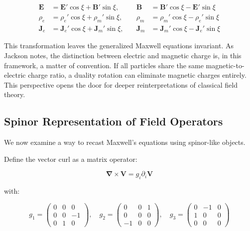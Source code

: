 \documentclass {article}
\renewcommand\vec{\mathbf}
\let\OldS\nabla
\renewcommand{\nabla}{\boldsymbol{\OldS}}
\begin{document}
\begin{equation}
\begin{aligned}
\vec{E} &= \vec{E}' \cos \xi + \vec{B}' \sin \xi, \quad
&\vec{B} &= \vec{B}' \cos \xi - \vec{E}' \sin \xi \\
\rho_e &= \rho_e' \cos \xi + \rho_m' \sin \xi, \quad
&\rho_m &= \rho_m' \cos \xi - \rho_e' \sin \xi \\
\vec{J}_e &= \vec{J}_e' \cos \xi + \vec{J}_m' \sin \xi, \quad
&\vec{J}_m &= \vec{J}_m' \cos \xi - \vec{J}_e' \sin \xi
\end{aligned}
\end{equation}


This transformation leaves the generalized Maxwell equations invariant. As Jackson notes, the distinction between electric and magnetic charge is, in this framework, a matter of convention. If all particles share the same magnetic-to-electric charge ratio, a duality rotation can eliminate magnetic charges entirely. This perspective opens the door for deeper reinterpretations of classical field theory.

\subsection{Spinor Representation of Field Operators}

We now examine a way to recast Maxwell’s equations using spinor-like objects.

Define the vector curl as a matrix operator:

\begin{equation}
\nabla \times \vec{V} = g_i \partial_i \vec{V}
\end{equation}

with:

\begin{equation}
g_1 = \begin{pmatrix}
0 & 0 & 0 \\
0 & 0 & -1 \\
0 & 1 & 0
\end{pmatrix}, \quad
g_2 = \begin{pmatrix}
0 & 0 & 1 \\
0 & 0 & 0 \\
-1 & 0 & 0
\end{pmatrix}, \quad
g_3 = \begin{pmatrix}
0 & -1 & 0 \\
1 & 0 & 0 \\
0 & 0 & 0
\end{pmatrix}
\end{equation}
\end{document}
